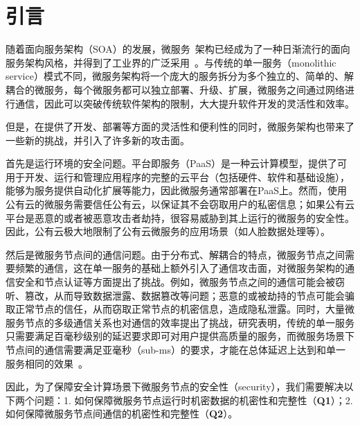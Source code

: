 \section{引言}\label{sec:introduction}


随着面向服务架构（SOA）的发展，微服务~\cite{}架构已经成为了一种日渐流行的面向服务架构风格，并得到了工业界的广泛采用~\cite{}。与传统的单一服务（monolithic service）模式不同，微服务架构将一个庞大的服务拆分为多个独立的、简单的、解耦合的微服务，每个微服务都可以独立部署、升级、扩展，微服务之间通过网络进行通信，因此可以突破传统软件架构的限制，大大提升软件开发的灵活性和效率。


但是，在提供了开发、部署等方面的灵活性和便利性的同时，微服务架构也带来了一些新的挑战，并引入了许多新的攻击面。

首先是运行环境的安全问题。平台即服务（PaaS）是一种云计算模型，提供了可用于开发、运行和管理应用程序的完整的云平台（包括硬件、软件和基础设施），能够为服务提供自动化扩展等能力，因此微服务通常部署在PaaS上。然而，使用公有云的微服务需要信任公有云，以保证其不会窃取用户的私密信息；如果公有云平台是恶意的或者被恶意攻击者劫持，很容易威胁到其上运行的微服务的安全性。因此，公有云极大地限制了公有云微服务的应用场景（如人脸数据处理等）。

然后是微服务节点间的通信问题。由于分布式、解耦合的特点，微服务节点之间需要频繁的通信，这在单一服务的基础上额外引入了通信攻击面，对微服务架构的通信安全和节点认证等方面提出了挑战。例如，微服务节点之间的通信可能会被窃听、篡改，从而导致数据泄露、数据篡改等问题；恶意的或被劫持的节点可能会骗取正常节点的信任，从而窃取正常节点的机密信息，造成隐私泄露。同时，大量微服务节点的多级通信关系也对通信的效率提出了挑战，研究表明，传统的单一服务只需要满足百毫秒级别的延迟要求即可对用户提供高质量的服务，而微服务场景下节点间的通信需要满足亚毫秒（sub-ms）的要求，才能在总体延迟上达到和单一服务相同的效果~\cite{}。

因此，为了保障安全计算场景下微服务节点的安全性（security），我们需要解决以下两个问题：1. 如何保障微服务节点运行时机密数据的机密性和完整性（\textbf{Q1}）；2. 如何保障微服务节点间通信的机密性和完整性（\textbf{Q2}）。

